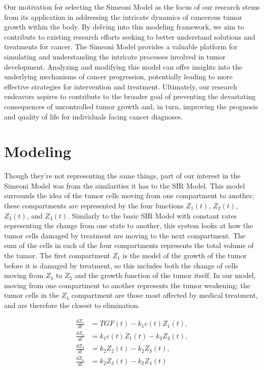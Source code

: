 \documentclass[11pt,reqno]{amsart}
\begin{document}
Our motivation for selecting the Simeoni Model as the focus of our research stems from its application in addressing the intricate dynamics of cancerous tumor growth within the body. By delving into this modeling framework, we aim to contribute to existing research efforts seeking to better understand solutions and treatments for cancer. The Simeoni Model provides a valuable platform for simulating and understanding the intricate processes involved in tumor development. Analyzing and modifying this model can offer insights into the underlying mechanisms of cancer progression, potentially leading to more effective strategies for intervention and treatment. Ultimately, our research endeavors aspires to contribute to the broader goal of preventing the devastating consequences of uncontrolled tumor growth and, in turn, improving the prognosis and quality of life for individuals facing cancer diagnoses.


\section{Modeling}
Though they're not representing the same things, part of our interest in the Simeoni Model was from the similarities it has to the SIR Model. This model surrounds the idea of the tumor cells moving from one compartment to another; these compartments are represented by the four functions $Z_1(t)$, $Z_2(t)$, $Z_3(t)$, and $Z_4(t)$. Similarly to the basic SIR Model with constant rates representing the change from one state to another, this system looks at how the tumor cells damaged by treatment are moving to the next compartment. The sum of the cells in each of the four compartments represents the total volume of the tumor. The first compartment $Z_1$ is the model of the growth of the tumor before it is damaged by treatment, so this includes both the change of cells moving from $Z_1$ to $Z_2$ and the growth function of the tumor itself. In our model, moving from one compartment to another represents the tumor weakening; the tumor cells in the $Z_4$ compartment are those most affected by medical treatment, and are therefore the closest to elimination. 

\begin{equation}\label{eq:1.1}
\begin{aligned}
    \frac{dZ_1}{dt} &= TGF(t) - k_1c(t)Z_1(t), \\
    \frac{dZ_2}{dt} &= k_1c(t)Z_1(t) - k_2Z_2(t), \\ 
    \frac{dZ_3}{dt} &= k_2Z_2(t) - k_2Z_3(t), \\
    \frac{dZ_4}{dt} &= k_2Z_3(t) - k_2Z_4(t)
\end{aligned}
\tag*{(1.1)}
\end{equation}
\hspace{2em}
\end{document}
